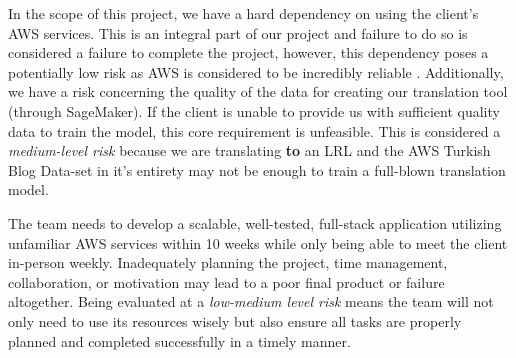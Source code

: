 \indent In the scope of this project, we have a hard dependency on using the client's AWS services. This is an integral part of our project and failure to do so is considered a failure to complete the project, however, this dependency poses a potentially low risk as AWS is considered to be incredibly reliable \cite{leopold2015}. Additionally, we have a risk concerning the quality of the data for creating our translation tool (through SageMaker). If the client is unable to provide us with sufficient quality data to train the model, this core requirement is unfeasible. This is considered a \textit{medium-level risk} because we are translating \textbf{to} an \acrshort{LRL} and the AWS Turkish Blog Data-set in it's entirety may not be enough to train a full-blown translation model.

\indent The team needs to develop a scalable, well-tested, full-stack application utilizing unfamiliar AWS services within 10 weeks while only being able to meet the client in-person weekly. Inadequately planning the project, time management, collaboration, or motivation may lead to a poor final product or failure altogether. Being evaluated at a \textit{low-medium level risk} means the team will not only need to use its resources wisely but also ensure all tasks are properly planned and completed successfully in a timely manner.




